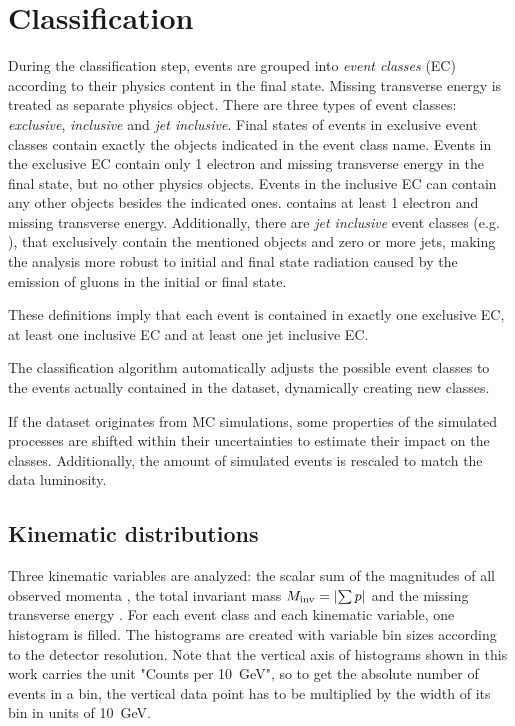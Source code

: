 \section{Classification}
During the classification step, events are grouped into \emph{event classes} (EC) according to their physics content in the final state. 
Missing transverse energy is treated as separate physics object. There are three  types of event classes: \emph{exclusive}, \emph{inclusive} and \emph{jet inclusive}. Final states of events in exclusive event classes contain exactly the objects indicated in the event class name. 
Events in the exclusive EC  contain only 1 electron and missing transverse energy in the final state, but no other physics objects.
Events in the inclusive EC can contain any other objects besides the indicated ones.  contains at least 1 electron and missing transverse energy. 
Additionally, there are \emph{jet inclusive} event classes (e.g. ), that exclusively contain the mentioned objects and zero or more jets, making the analysis more robust to initial and final state radiation caused by the emission of gluons in the initial or final state.

These definitions imply that each event is contained in exactly one exclusive EC, at least one inclusive EC and at least one jet inclusive EC.

The classification algorithm automatically adjusts the possible event classes to the events actually contained in the dataset, dynamically creating new classes. 

If the dataset originates from MC simulations, some properties of the simulated processes are shifted within their uncertainties to estimate their impact on the classes. Additionally, the amount of simulated events is rescaled to match the data luminosity.

\subsection{Kinematic distributions}
Three kinematic variables are analyzed: the scalar sum of the magnitudes of all observed momenta \sumpT, the total invariant mass ${M_\mathrm{inv}} = \abs{\sum p}$ and the missing transverse energy \MET.
For each event class and each kinematic variable, one histogram is filled. The histograms are created with variable bin sizes according to the detector resolution\cite[p. 52]{Papacz2014Model}. Note that the vertical axis of histograms shown in this work carries the unit "Counts per \SI{10}{\GeV}", so to get the absolute number of events in a bin, the vertical data point has to be multiplied by the width of its bin in units of \SI{10}{\GeV}.

